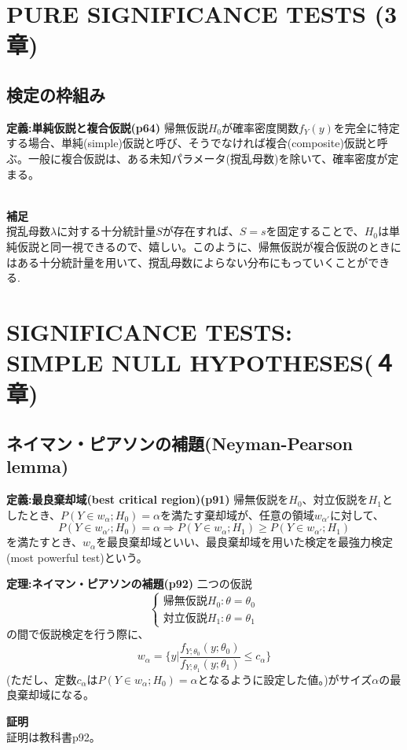 \documentclass[10pt]{jarticle}
\begin{document}
\section{PURE SIGNIFICANCE TESTS (3章)}
\subsection{検定の枠組み}
\begin{itembox}[l]{\textbf{定義:単純仮説と複合仮説(p64)}}
帰無仮説$H_0$が確率密度関数$f_Y(y)$を完全に特定する場合、単純(simple)仮説と呼び、そうでなければ複合(composite)仮説と呼ぶ。一般に複合仮説は、ある未知パラメータ(撹乱母数)を除いて、確率密度が定まる。
\end{itembox}
\\
\textbf{補足}\\
撹乱母数$\lambda$に対する十分統計量$S$が存在すれば、$S=s$を固定することで、$H_0$は単純仮説と同一視できるので、嬉しい。このように、帰無仮説が複合仮説のときにはある十分統計量を用いて、撹乱母数によらない分布にもっていくことができる.



\section{SIGNIFICANCE TESTS:\\SIMPLE NULL HYPOTHESES(４章)}


\subsection{ネイマン・ピアソンの補題(Neyman-Pearson lemma)}
\begin{itembox}[l]{\textbf{定義:最良棄却域(best critical region)(p91)}}
帰無仮説を$H_0$、対立仮説を$H_1$としたとき、$P(Y\in w_\alpha;H_0)=\alpha$を満たす棄却域が、任意の領域$w_{\alpha'}$に対して、
\[P(Y\in w_{\alpha'};H_0)=\alpha \Longrightarrow P(Y\in w_{\alpha};H_1) \ge P(Y\in w_{\alpha'};H_1)\]
を満たすとき、$w_{\alpha}$を最良棄却域といい、最良棄却域を用いた検定を最強力検定(most powerful test)という。
\end{itembox}


\begin{itembox}[l]{\textbf{定理:ネイマン・ピアソンの補題(p92)}}
二つの仮説
\[\left \{
\begin{array}{l}
帰無仮説　H_0:\theta=\theta_0　 \\
対立仮説　H_1:\theta=\theta_1　
\end{array}
\right.\]
の間で仮説検定を行う際に、
\[w_\alpha=\{y|\frac{f_{Y;\theta_0}(y;\theta_0)}{f_{Y;\theta_1}(y;\theta_1)}\le c_\alpha\}\]
(ただし、定数$c_\alpha$は$P(Y\in w_\alpha;H_0)=\alpha$となるように設定した値。)がサイズ$\alpha$の最良棄却域になる。
\end{itembox}
\textbf{証明}\\
証明は教科書p92。
\end{document}
